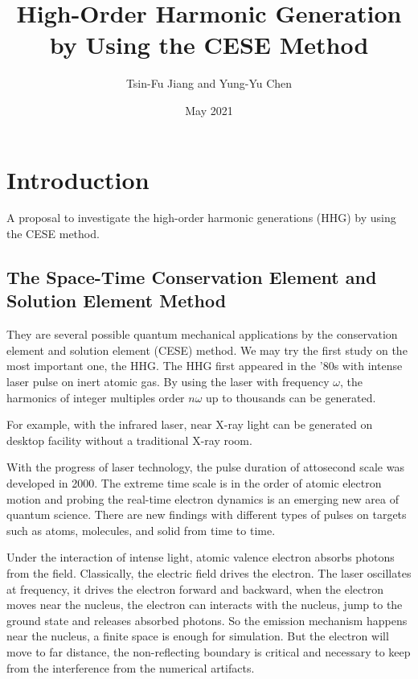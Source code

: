 \documentclass{isildur}
\title{
%
High-Order Harmonic Generation by Using the CESE Method
%
}
\author{
%
Tsin-Fu Jiang and Yung-Yu Chen
%
}
\date{May 2021}
\begin{document}
\maketitle

\tableofcontents

\chapter{Introduction}
\label{c:intro}

A proposal to investigate the high-order harmonic generations (HHG) by using
the CESE method.

\section{The Space-Time Conservation Element and Solution Element Method}

They are several possible quantum mechanical applications by the conservation
element and solution element (CESE) method.  We may try the first study on the
most important one, the HHG.  The HHG first appeared in the ’80s with intense
laser pulse on inert atomic gas.  By using the laser with frequency $\omega$,
the harmonics of integer multiples order $n\omega$ up to thousands can be
generated.

For example, with the infrared laser, near X-ray light can be generated on
desktop facility without a traditional X-ray room.

With the progress of laser technology, the pulse duration of attosecond scale
was developed in 2000.  The extreme time scale is in the order of atomic
electron motion and probing the real-time electron dynamics is an emerging new
area of quantum science.  There are new findings with different types of pulses
on targets such as atoms, molecules, and solid from time to time.

Under the interaction of intense light, atomic valence electron absorbs photons
from the field.  Classically, the electric field drives the electron.  The
laser oscillates at frequency, it drives the electron forward and backward,
when the electron moves near the nucleus, the electron can interacts with the
nucleus, jump to the ground state and releases absorbed photons.  So the
emission mechanism happens near the nucleus, a finite space is enough for
simulation.  But the electron will move to far distance, the non-reflecting
boundary is critical and necessary to keep from the interference from the
numerical artifacts.
\end{document}
